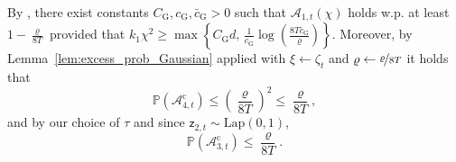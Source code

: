\documentclass[11pt]{article}
\theoremstyle{definition}
\theoremstyle{plain}
\providecommand{\lemmaref}[1]{Lemma~\ref{#1}}
\begin{document}
By \citet[Lemma.~1]{pilanci_hessiansketch}, there exist constants
$C_{\mathrm{G}}, c_{\mathrm{G}}, \bar{c}_{\mathrm{G}} > 0$ such that
$\mathcal{A}_{1,t}(\chi)$ holds w.p. at least $1-\frac{\varrho}{8T}$ provided that $k_1\chi^2 \ge \max\left\{
    C_{\mathrm{G}} d,\,
    \frac{1}{c_{\mathrm{G}}}\log\!\left(\frac{8T\bar{c}_{\mathrm{G}}}{\varrho}\right)
\right\}.$ Moreover, by \lemmaref{lem:excess_prob_Gaussian} applied with $\xi \gets \zeta_t$ and $\varrho \gets \nicefrac{\varrho}{8T}$ it holds that  
\begin{equation}
    \mathbb P(\mathcal{A}_{4,t}^{\mathrm{c}})\le \left(\frac{\varrho}{8T}\right)^2 \le \frac{\varrho}{8T},
\end{equation}
and by our choice of $\tau$ and since $\mathsf z_{2,t}\sim \mathrm{Lap}(0,1)$,
\begin{equation}
    \mathbb P(\mathcal{A}_{3,t}^{\mathrm{c}})\le \frac{\varrho}{8T}.
\end{equation}
\end{document}
